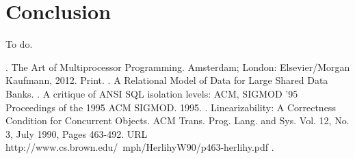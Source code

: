 \documentclass[12pt]{article} %
\begin{document}
\section{Conclusion} %
To do.

\begin{thebibliography}{99} %

. The Art of Multiprocessor Programming. Amsterdam; London: Elsevier/Morgan Kaufmann, 2012. Print.
. A Relational Model of Data for Large Shared Data Banks. 
. A critique of ANSI SQL isolation levels: ACM, SIGMOD '95 Proceedings of the 1995 ACM SIGMOD. 1995.
. Linearizability: A Correctness Condition for Concurrent Objects. ACM Trans. Prog. Lang. and Sys. Vol. 12, No. 3, July 1990, Pages 463-492. URL http://www.cs.brown.edu/~mph/HerlihyW90/p463-herlihy.pdf
.
\end{thebibliography}

\end{document}
